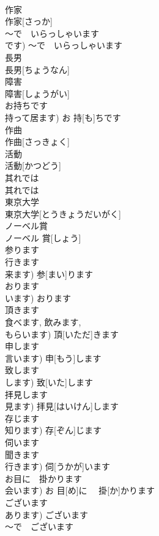 \documentclass[8pt]{extreport}
\begin{document}
\begin{CJK}{UTF8}{min}
\\	作家	
\\	作家[さっか]	
\\	〜で　いらっしゃいます	
\\	です)	〜で　いらっしゃいます	
\\	長男	
\\	長男[ちょうなん]	
\\	障害	
\\	障害[しょうがい]	
\\	お持ちです	
\\	持って居ます)	お 持[も]ちです	
\\	作曲	
\\	作曲[さっきょく]	
\\	活動	
\\	活動[かつどう]	
\\	其れでは	
\\	其れでは	
\\	東京大学	
\\	東京大学[とうきょうだいがく]	
\\	ノーベル賞	
\\	ノーベル 賞[しょう]	
\\	参ります	
\\	行きます 
\\	来ます)	参[まい]ります	
\\	おります	
\\	います)	おります	
\\	頂きます	
\\	食べます, 飲みます, 
\\	もらいます)	頂[いただ]きます	
\\	申します	
\\	言います)	申[もう]します	
\\	致します	
\\	します)	致[いた]します	
\\	拝見します	
\\	見ます)	拝見[はいけん]します	
\\	存じます	
\\	知ります)	存[ぞん]じます	
\\	伺います	
\\	聞きます 
\\	行きます)	伺[うかが]います	
\\	お目に　掛かります	
\\	会います)	お 目[め]に　 掛[か]かります	
\\	ございます	
\\	あります)	ございます	
\\	〜で　ございます	

\end{CJK}
\end{document}
